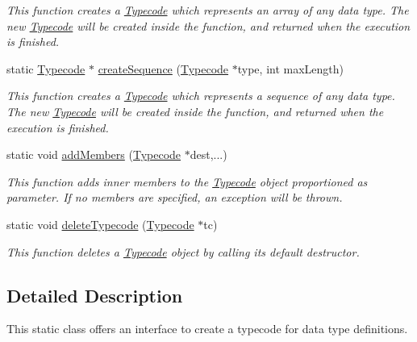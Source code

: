 \begin{DoxyCompactItemize}
\begin{DoxyCompactList}\small\item\em This function creates a \hyperlink{class_dynamic_fast_buffers_1_1_typecode}{Typecode} which represents an array of any data type. The new \hyperlink{class_dynamic_fast_buffers_1_1_typecode}{Typecode} will be created inside the function, and returned when the execution is finished. \end{DoxyCompactList}\item 
static \hyperlink{class_dynamic_fast_buffers_1_1_typecode}{Typecode} $\ast$ \hyperlink{class_dynamic_fast_buffers_1_1_typecode_a_p_i_a392b2b5d4dba716690e18b19eb6c27ab}{create\-Sequence} (\hyperlink{class_dynamic_fast_buffers_1_1_typecode}{Typecode} $\ast$type, int max\-Length)
\begin{DoxyCompactList}\small\item\em This function creates a \hyperlink{class_dynamic_fast_buffers_1_1_typecode}{Typecode} which represents a sequence of any data type. The new \hyperlink{class_dynamic_fast_buffers_1_1_typecode}{Typecode} will be created inside the function, and returned when the execution is finished. \end{DoxyCompactList}\item 
static void \hyperlink{class_dynamic_fast_buffers_1_1_typecode_a_p_i_af0adfea01d03734fd357f848415beac1}{add\-Members} (\hyperlink{class_dynamic_fast_buffers_1_1_typecode}{Typecode} $\ast$dest,...)
\begin{DoxyCompactList}\small\item\em This function adds inner members to the \hyperlink{class_dynamic_fast_buffers_1_1_typecode}{Typecode} object proportioned as parameter. If no members are specified, an exception will be thrown. \end{DoxyCompactList}\item 
static void \hyperlink{class_dynamic_fast_buffers_1_1_typecode_a_p_i_af30ffaf78153cdb08705763b5864fa19}{delete\-Typecode} (\hyperlink{class_dynamic_fast_buffers_1_1_typecode}{Typecode} $\ast$tc)
\begin{DoxyCompactList}\small\item\em This function deletes a \hyperlink{class_dynamic_fast_buffers_1_1_typecode}{Typecode} object by calling its default destructor. \end{DoxyCompactList}\end{DoxyCompactItemize}


\subsection{Detailed Description}
This static class offers an interface to create a typecode for data type definitions. 

